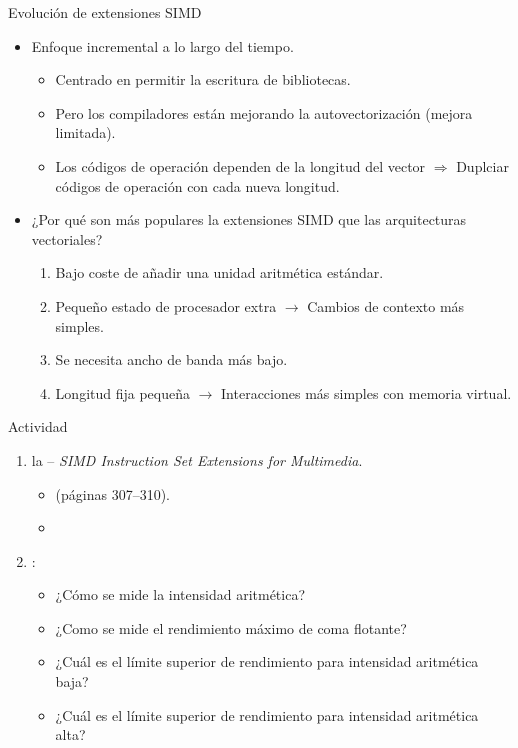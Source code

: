 \begin{frame}[t]{Evolución de extensiones SIMD}
\begin{itemize}
  \item Enfoque incremental a lo largo del tiempo.
    \begin{itemize}
      \item Centrado en permitir la escritura de bibliotecas.
      \item Pero los compiladores están mejorando la autovectorización (mejora limitada).
      \item Los códigos de operación dependen de la longitud del vector
            $\Rightarrow$ 
            Duplciar códigos de operación con cada nueva longitud.
    \end{itemize}

  \item ¿Por qué son más populares la extensiones SIMD que las arquitecturas vectoriales?
    \begin{enumerate}
      \item Bajo coste de añadir una unidad aritmética estándar.
      \item Pequeño estado de procesador extra $\rightarrow$ Cambios de contexto más simples.
      \item Se necesita ancho de banda más bajo.
      \item Longitud fija pequeña $\rightarrow$ Interacciones más simples con memoria virtual.
    \end{enumerate}
\end{itemize}
\end{frame}

\begin{frame}[t]{Actividad}
\begin{enumerate}
  \item {} la  --
        \emph{SIMD Instruction Set Extensions for Multimedia}.
    \begin{itemize}
      \item {} 
            (páginas 307--310).
      \item \credithennessy
    \end{itemize}

  \item {}:
    \begin{itemize}
      \item ¿Cómo se mide la intensidad aritmética?
      \item ¿Como se mide el rendimiento máximo de coma flotante?
      \item ¿Cuál es el límite superior de rendimiento para intensidad aritmética baja?
      \item ¿Cuál es el límite superior de rendimiento para intensidad aritmética alta?
    \end{itemize}
\end{enumerate}
\end{frame}
